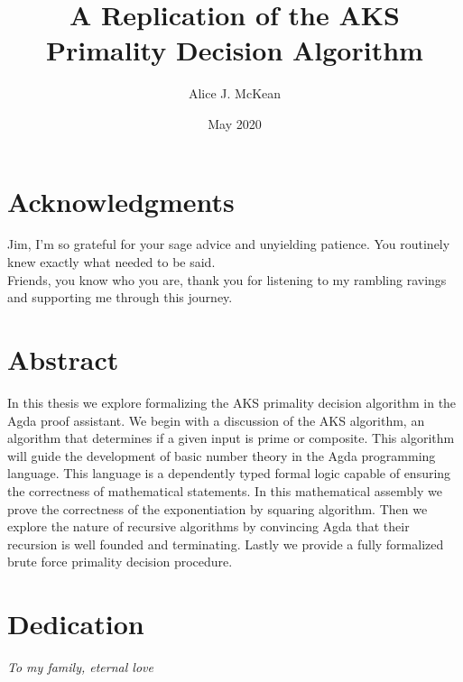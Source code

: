 \documentclass[12pt,twoside]{reedthesis}
\title{A Replication of the AKS Primality Decision Algorithm}
\author{Alice J. McKean}
\date{May 2020}
\newcommand{\Agda}[0]{Agda}
\begin{document}
\maketitle
\frontmatter
\pagestyle{empty}

\chapter*{Acknowledgments}
Jim, I'm so grateful for your sage advice and unyielding patience. You routinely
knew exactly what needed to be said. \\

Friends, you know who you are, thank you for listening to my rambling ravings
and supporting me through this journey.

\chapter*{Abstract}
In this thesis we explore formalizing the AKS primality decision algorithm in
the \Agda{} proof assistant. We begin with a discussion of the AKS algorithm, an
algorithm that determines if a given input is prime or composite. This algorithm
will guide the development of basic number theory in the \Agda{} programming
language. This language is a dependently typed formal logic capable of ensuring
the correctness of mathematical statements. In this mathematical assembly we
prove the correctness of the exponentiation by squaring algorithm. Then we
explore the nature of recursive algorithms by convincing \Agda{} that their
recursion is well founded and terminating. Lastly we provide a fully
formalized brute force primality decision procedure.

\chapter*{Dedication}
\textit{To my family, eternal love}

\tableofcontents

\mainmatter
\pagestyle{fancyplain}








\appendix

\backmatter

\nocite{gnu-parallel}


\end{document}
